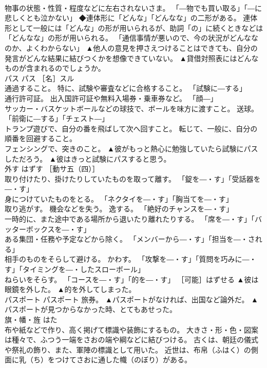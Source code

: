 \documentclass[8pt]{extreport}
\begin{document}
\begin{CJK}{UTF8}{min}
\\	物事の状態・性質・程度などに左右されないさま。 「―物でも買い取る」「―に悲しくとも泣かない」 ◆連体形に「どんな」「どんなな」の二形がある。 連体形として一般には「どんな」の形が用いられるが、助詞「の」に続くときなどは「どんなな」の形が用いられる。 「通信事情が悪いので、今の状況がどんななのか、よくわからない」	▲他人の意見を押さえつけることはできても、自分の発言がどんな結果に結びつくかを想像できていない。 ▲貸借対照表にはどんなものが含まれるのでしょうか。
\\	パス	パス	［名］スル 
\\	通過すること。 特に、試験や審査などに合格すること。 「試験に―する」 
\\	通行許可証。 出入国許可証や無料入場券・乗車券など。 「顔―」 
\\	サッカー・バスケットボールなどの球技で、ボールを味方に渡すこと。 送球。 「前衛に―する」「チェスト―」 
\\	トランプ遊びで、自分の番を飛ばして次へ回すこと。 転じて、一般に、自分の順番を回避すること。 
\\	フェンシングで、突きのこと。	▲彼がもっと熱心に勉強していたら試験にパスしただろう。 ▲彼はきっと試験にパスすると思う。
\\	外す	はずす	［動サ五（四）］ 
\\	取り付けたり、掛けたりしていたものを取って離す。 「錠を―・す」「受話器を―・す」 
\\	身につけていたものをとる。 「ネクタイを―・す」「胸当てを―・す」 
\\	取り逃がす。 機会などを失う。 逸する。 「絶好のチャンスを―・す」 
\\	一時的に、また途中である場所から退いたり離れたりする。 「席を―・す」「バッターボックスを―・す」 
\\	ある集団・任務や予定などから除く。 「メンバーから―・す」「担当を―・される」 
\\	相手のものをそらして避ける。 かわす。 「攻撃を―・す」「質問を巧みに―・す」「タイミングを―・したスローボール」 
\\	ねらいをそらす。 「コースを―・す」「的を―・す」 ［可能］はずせる	▲彼は眼鏡を外した。 ▲的を外してしまった。
\\	パスポート	パスポート	旅券。	▲パスポートがなければ、出国など論外だ。 ▲パスポートが見つからなかった時、とてもあせった。
\\	旗・幡・旌	はた	
\\	布や紙などで作り、高く掲げて標識や装飾にするもの。 大きさ・形・色・図案は種々で、ふつう一端をさおの端や綱などに結びつける。 古くは、朝廷の儀式や祭礼の飾り、また、軍陣の標識として用いた。 近世は、布帛（ふはく）の側面に乳（ち）をつけてさおに通した幟（のぼり）がある。 

\end{CJK}
\end{document}
